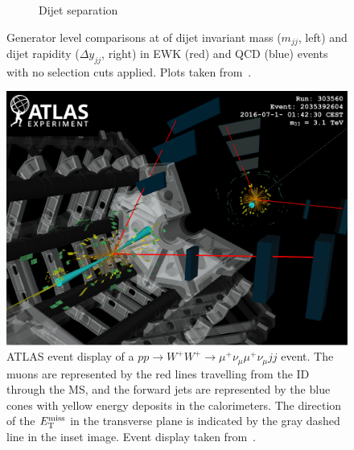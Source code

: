 \begin{figure}[htbp]
\begin{subfigure}[b]{.4842\textwidth}
    \caption{Dijet separation}
    \label{fig:ssww13tev_dijet_comparison_dyjj}
  \end{subfigure}
  \caption[Generator level comparisons at  of dijet invariant mass ($m_{jj}$, left) and dijet rapidity ($\Delta y_{jj}$, right) in EWK (red) and QCD (blue) \ssww events with no selection cuts applied.]{Generator level comparisons at  of dijet invariant mass ($m_{jj}$, left) and dijet rapidity ($\Delta y_{jj}$, right) in EWK (red) and QCD (blue) \ssww events with no selection cuts applied.  Plots taken from~\cite{2017.physics-opportunities-100tev}.}
  \label{fig:ssww13tev_dijet_comparison}
\end{figure}

\begin{figure}[htbp]
  \centering
  \includegraphics[width=.95\textwidth]{figs/ssww_13tev/introduction/evtdisplay_mm}
  \caption[ATLAS event display of a $pp\rightarrow W^{+}W^{+}\rightarrow\mu^{+}\nu_\mu\mu^{+}\nu_\mu jj$ event.  The muons are represented by the red lines travelling from the ID through the MS, and the forward jets are represented by the blue cones with yellow energy deposits in the calorimeters.  The direction of the $\met$ in the transverse plane is indicated by the gray dashed line in the inset image.]{ATLAS event display of a $pp\rightarrow W^{+}W^{+}\rightarrow\mu^{+}\nu_\mu\mu^{+}\nu_\mu jj$ event.  The muons are represented by the red lines travelling from the ID through the MS, and the forward jets are represented by the blue cones with yellow energy deposits in the calorimeters.  The direction of the $\met$ in the transverse plane is indicated by the gray dashed line in the inset image.  Event display taken from~\cite{2018.ssww-13tev-paper-draft}.}
  \label{fig:ssww13tev_event_display_mm}
\end{figure}

